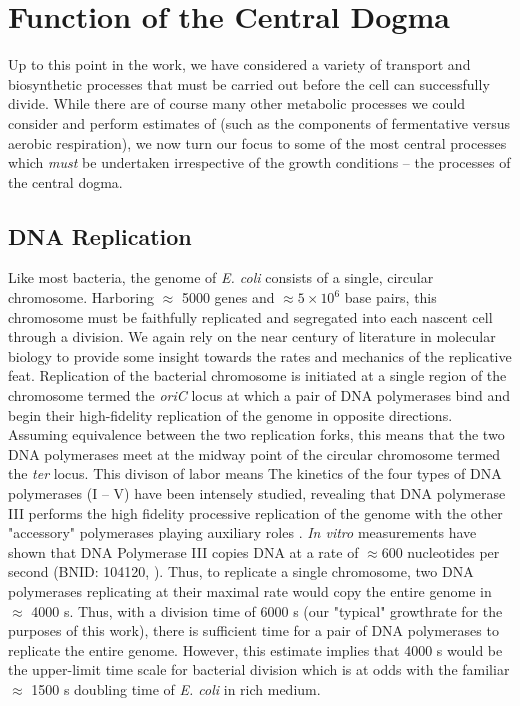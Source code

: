 \section{Function of the Central Dogma}
Up to this point in the work, we have considered a variety of transport and
biosynthetic processes that must be carried out before the cell can successfully
divide. While there are of course many other metabolic processes we could
consider and perform estimates of (such as the components of fermentative versus
aerobic respiration), we now turn our focus to some of the most central
processes which \textit{must} be undertaken irrespective of the growth
conditions -- the processes of the central dogma. 

\subsection{DNA Replication}
Like most bacteria, the genome of \textit{E. coli} consists of a single,
circular chromosome. Harboring $\approx$ 5000 genes and $\approx 5\times
10^6$ base pairs, this chromosome must be faithfully replicated and
segregated into each nascent cell through a division. We again rely on the
near century of literature in molecular biology to provide some insight
towards the rates and mechanics of the replicative feat. Replication of the
bacterial chromosome is initiated at a single region of the chromosome termed
the \textit{oriC} locus at which a pair of DNA polymerases bind and begin
their high-fidelity replication of the genome in opposite directions.
Assuming equivalence between the two replication forks, this means that the
two DNA polymerases meet at the midway point of the circular chromosome
termed the \textit{ter} locus. This divison of labor means The kinetics of
the four types of DNA polymerases (I -- V) have been intensely studied,
revealing that DNA polymerase III performs the high fidelity processive
replication of the genome with the other "accessory" polymerases playing
auxiliary roles \cite{fijalkowska2012}. \textit{In vitro} measurements have
shown that DNA Polymerase III copies DNA at a rate of $\approx 600$
nucleotides per second (BNID: 104120, \cite{milo2010}). Thus, to replicate a
single chromosome, two DNA polymerases replicating at their maximal rate would
copy the entire genome in $\approx$ 4000 s. Thus, with a division time of 6000
s (our "typical" growthrate for the purposes of this work), there is sufficient
time for a pair of DNA polymerases to replicate the entire genome. However, this
estimate implies that 4000 s would be the upper-limit time scale for bacterial
division which is at odds with the familiar $\approx$ 1500 s doubling time of
\textit{E. coli} in rich medium.

